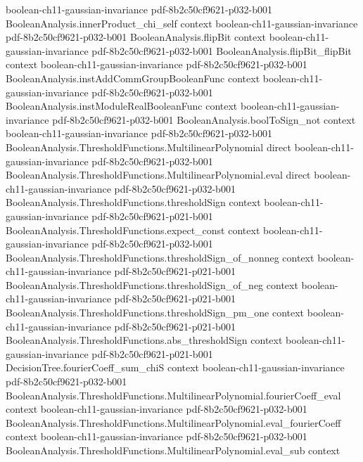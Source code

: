\begin{lemma}
  {boolean-ch11-gaussian-invariance}
  {pdf-8b2c50cf9621-p032-b001}
\proofstep
  {BooleanAnalysis.innerProduct_chi_self}
  {context}
  {boolean-ch11-gaussian-invariance}
  {pdf-8b2c50cf9621-p032-b001}
\proofstep
  {BooleanAnalysis.flipBit}
  {context}
  {boolean-ch11-gaussian-invariance}
  {pdf-8b2c50cf9621-p032-b001}
\proofstep
  {BooleanAnalysis.flipBit_flipBit}
  {context}
  {boolean-ch11-gaussian-invariance}
  {pdf-8b2c50cf9621-p032-b001}
\proofstep
  {BooleanAnalysis.instAddCommGroupBooleanFunc}
  {context}
  {boolean-ch11-gaussian-invariance}
  {pdf-8b2c50cf9621-p032-b001}
\proofstep
  {BooleanAnalysis.instModuleRealBooleanFunc}
  {context}
  {boolean-ch11-gaussian-invariance}
  {pdf-8b2c50cf9621-p032-b001}
\proofstep
  {BooleanAnalysis.boolToSign_not}
  {context}
  {boolean-ch11-gaussian-invariance}
  {pdf-8b2c50cf9621-p032-b001}
\proofstep
  {BooleanAnalysis.ThresholdFunctions.MultilinearPolynomial}
  {direct}
  {boolean-ch11-gaussian-invariance}
  {pdf-8b2c50cf9621-p032-b001}
\proofstep
  {BooleanAnalysis.ThresholdFunctions.MultilinearPolynomial.eval}
  {direct}
  {boolean-ch11-gaussian-invariance}
  {pdf-8b2c50cf9621-p032-b001}
\proofstep
  {BooleanAnalysis.ThresholdFunctions.thresholdSign}
  {context}
  {boolean-ch11-gaussian-invariance}
  {pdf-8b2c50cf9621-p021-b001}
\proofstep
  {BooleanAnalysis.ThresholdFunctions.expect_const}
  {context}
  {boolean-ch11-gaussian-invariance}
  {pdf-8b2c50cf9621-p032-b001}
\proofstep
  {BooleanAnalysis.ThresholdFunctions.thresholdSign_of_nonneg}
  {context}
  {boolean-ch11-gaussian-invariance}
  {pdf-8b2c50cf9621-p021-b001}
\proofstep
  {BooleanAnalysis.ThresholdFunctions.thresholdSign_of_neg}
  {context}
  {boolean-ch11-gaussian-invariance}
  {pdf-8b2c50cf9621-p021-b001}
\proofstep
  {BooleanAnalysis.ThresholdFunctions.thresholdSign_pm_one}
  {context}
  {boolean-ch11-gaussian-invariance}
  {pdf-8b2c50cf9621-p021-b001}
\proofstep
  {BooleanAnalysis.ThresholdFunctions.abs_thresholdSign}
  {context}
  {boolean-ch11-gaussian-invariance}
  {pdf-8b2c50cf9621-p021-b001}
\proofstep
  {DecisionTree.fourierCoeff_sum_chiS}
  {context}
  {boolean-ch11-gaussian-invariance}
  {pdf-8b2c50cf9621-p032-b001}
\proofstep
  {BooleanAnalysis.ThresholdFunctions.MultilinearPolynomial.fourierCoeff_eval}
  {context}
  {boolean-ch11-gaussian-invariance}
  {pdf-8b2c50cf9621-p032-b001}
\proofstep
  {BooleanAnalysis.ThresholdFunctions.MultilinearPolynomial.eval_fourierCoeff}
  {context}
  {boolean-ch11-gaussian-invariance}
  {pdf-8b2c50cf9621-p032-b001}
\proofstep
  {BooleanAnalysis.ThresholdFunctions.MultilinearPolynomial.eval_sub}
  {context}

\end{lemma}
